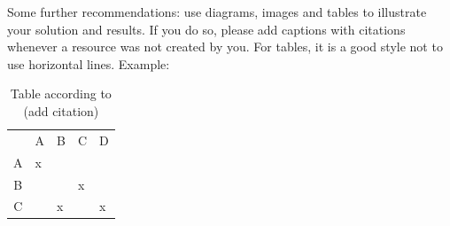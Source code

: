 \documentclass[
thesis  %
]{csthes}
\begin{document}


Some further recommendations: use diagrams, images and tables to illustrate your solution and results. If you do so, please add captions with citations whenever a resource was not created by you. For tables, it is a good style not to use horizontal lines. Example:

\begin{table}[hb!]
\centering
\caption{Table according to (add citation)} 
\begin{tabular}{|c|l|l|l|l|}
\hline
\rowcolor[HTML]{C0C0C0} 
\multicolumn{1}{|l|}{\cellcolor[HTML]{C0C0C0}{\color[HTML]{000000} Some Table}} & {\color[HTML]{000000} A} & {\color[HTML]{000000} B} & {\color[HTML]{000000} C} & {\color[HTML]{000000} D} \\ 
A                                                                               & x                        &                          &                          &                          \\ 
B                                                                               &                          &                          & x                        &                          \\ 
C                                                                               &                          & x                        &                          & x                        \\ 
\end{tabular}

\end{table}
\end{document}

